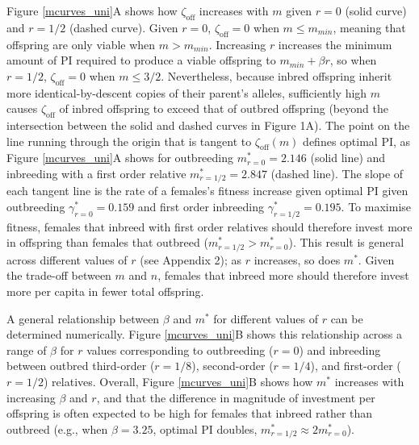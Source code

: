 \documentclass[10pt,letterpaper]{article}
\begin{document}
Figure \ref{mcurves_uni}A shows how $\zeta_{\textrm{off}}$ increases with $m$ given $r=0$ (solid curve) and $r=1/2$ (dashed curve). Given $r=0$, $\zeta_{\textrm{off}}=0$ when $m \leq m_{min}$, meaning that offspring are only viable when $m>m_{min}$. Increasing $r$ increases the minimum amount of PI required to produce a viable offspring to $m_{min}+\beta r$, so when $r=1/2$, $\zeta_{\textrm{off}}=0$ when $m \leq 3/2$. Nevertheless, because inbred offspring inherit more identical-by-descent copies of their parent's alleles, sufficiently high $m$ causes $\zeta_{\textrm{off}}$ of inbred offspring to exceed that of outbred offspring (beyond the intersection between the solid and dashed curves in Figure 1A). The point on the line running through the origin that is tangent to $\zeta_{\textrm{off}}(m)$ defines optimal PI, as Figure \ref{mcurves_uni}A shows for outbreeding $m^{*}_{r=0}=2.146$ (solid line) and inbreeding with a first order relative $m^{*}_{r=1/2}=2.847$ (dashed line). The slope of each tangent line is the rate of a females's fitness increase given optimal PI given outbreeding $\gamma^{*}_{r=0}=0.159$ and first order inbreeding $\gamma^{*}_{r=1/2}=0.195$. To maximise fitness, females that inbreed with first order relatives should therefore invest more in offspring than females that outbreed ($m^{*}_{r=1/2}>m^{*}_{r=0}$). This result is general across different values of $r$ (see Appendix 2); as $r$ increases, so does $m^{*}$. Given the trade-off between $m$ and $n$, females that inbreed more should therefore invest more per capita in fewer total offspring. 

A general relationship between $\beta$ and $m^{*}$ for different values of $r$ can be determined numerically. Figure \ref{mcurves_uni}B shows this relationship across a range of $\beta$ for $r$ values corresponding to outbreeding ($r=0$) and inbreeding between outbred third-order ($r=1/8$), second-order ($r=1/4$), and first-order ($r=1/2$) relatives. Overall, Figure \ref{mcurves_uni}B shows how $m^{*}$ increases with increasing $\beta$ and $r$, and that the difference in magnitude of investment per offspring is often expected to be high for females that inbreed rather than outbreed (e.g., when $\beta=3.25$, optimal PI doubles, $m^{*}_{r=1/2} \approx 2m^{*}_{r=0}$).
\end{document}
